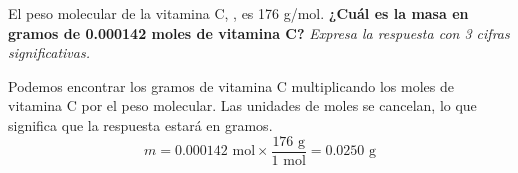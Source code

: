El peso molecular de la vitamina C, , es 176 g/mol.
\textbf{¿Cuál es la masa en gramos de 0.000142 moles de vitamina C?}
\emph{Expresa la respuesta con 3 cifras significativas.}

\begin{solutionbox}{4cm}
    Podemos encontrar los gramos de vitamina C multiplicando los moles de vitamina C por el peso molecular. Las unidades de moles se cancelan, lo que significa que la respuesta estará en gramos.
    \[ m =  0.000142 \text{ mol} \times \frac{176 \text{ g}}{1 \text{ mol}} = 0.0250 \text{ g} \]
\end{solutionbox}
